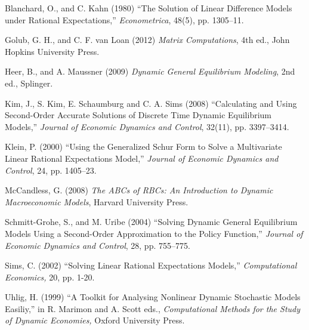 \documentclass[a4j, dvipdfmx]{jarticle}
\begin{document}
\begin{thebibliography}{xxx}

Blanchard, O., and C. Kahn (1980) ``The Solution of Linear Difference Models under Rational Expectations,'' {\it Econometrica}, 48(5), pp. 1305--11.

Golub, G. H., and C. F. van Loan (2012) {\it Matrix Computations}, 4th ed., John Hopkins University Press.

Heer, B., and A. Maussner (2009) {\it Dynamic General Equilibrium Modeling}, 2nd ed., Splinger.

Kim, J., S. Kim, E. Schaumburg and C. A. Sims (2008) ``Calculating and Using Second-Order Accurate Solutions of Discrete Time Dynamic Equilibrium Models,'' {\it Journal of Economic Dynamics and Control}, 32(11), pp. 3397--3414.

Klein, P. (2000) ``Using the Generalized Schur Form to Solve a Multivariate Linear Rational Expectations Model,'' {\it Journal of Economic Dynamics and Control}, 24, pp. 1405--23.

McCandless, G. (2008) {\it The ABCs of RBCs: An Introduction to Dynamic Macroeconomic Models}, Harvard University Press.

Schmitt-Grohe, S., and M. Uribe (2004) ``Solving Dynamic General Equilibrium Models Using a Second-Order Approximation to the Policy Function,'' {\it Journal of Economic Dynamics and Control}, 28, pp. 755--775.

Sims, C. (2002) ``Solving Linear Rational Expectations Models,'' {\it Computational Economics,} 20, pp. 1-20.

Uhlig, H. (1999) ``A Toolkit for Analysing Nonlinear Dynamic Stochastic Models Easiliy,'' in R. Marimon and A. Scott eds., {\it Computational Methods for the Study of Dynamic Economies,} Oxford University Press.

\end{thebibliography}
\end{document}
